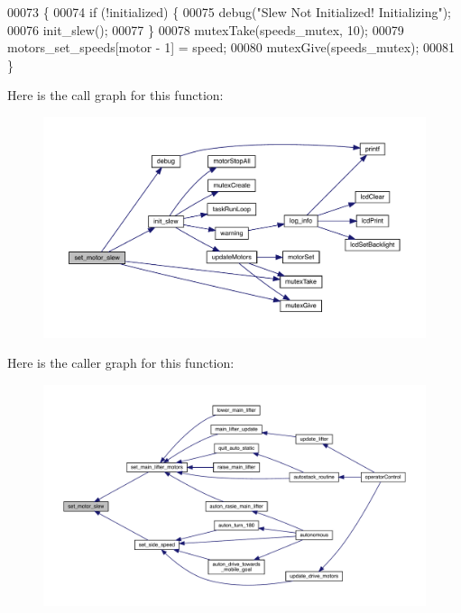 \begin{DoxyCode}
00073                                           \{
00074   \textcolor{keywordflow}{if} (!initialized) \{
00075     debug(\textcolor{stringliteral}{"Slew Not Initialized! Initializing"});
00076     init_slew();
00077   \}
00078   mutexTake(speeds_mutex, 10);
00079   motors_set_speeds[motor - 1] = speed;
00080   mutexGive(speeds_mutex);
00081 \}
\end{DoxyCode}
Here is the call graph for this function\+:
\nopagebreak
\begin{figure}[H]
\begin{center}
\leavevmode
\includegraphics[width=350pt]{slew_8c_a7dff2b79dffe55fb936d977594d7c01d_cgraph}
\end{center}
\end{figure}
Here is the caller graph for this function\+:
\nopagebreak
\begin{figure}[H]
\begin{center}
\leavevmode
\includegraphics[width=350pt]{slew_8c_a7dff2b79dffe55fb936d977594d7c01d_icgraph}
\end{center}
\end{figure}
\mbox{\label{slew_8c_a807a87c5df438fde21c1e8213906695b}} 
